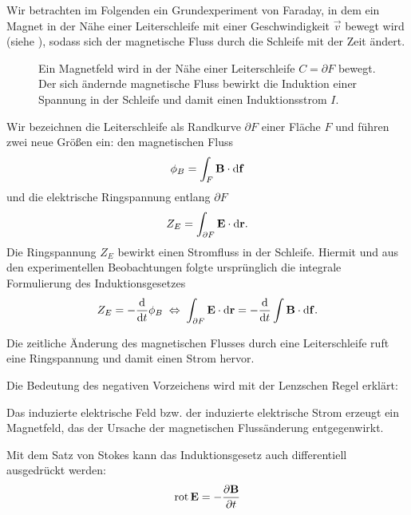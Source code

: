 Wir betrachten im Folgenden ein Grundexperiment von Faraday, in dem ein Magnet in der Nähe einer Leiterschleife mit einer Geschwindigkeit $\vec v$ bewegt wird (siehe ), sodass sich der magnetische Fluss durch die Schleife mit der Zeit ändert.

\begin{figure}
	\centering
	\tfigInductionA
	\caption{Ein Magnetfeld wird in der Nähe einer Leiterschleife $C=\partial F$ bewegt. Der sich ändernde magnetische Fluss bewirkt die Induktion einer Spannung in der Schleife und damit einen Induktionsstrom $I$. }
	\label{fig:inductionA}
\end{figure}

Wir bezeichnen die Leiterschleife als Randkurve $\partial F$ einer Fläche $F$ und führen zwei neue Größen ein: den magnetischen Fluss
\begin{equation*}
	\phi _{B}=\int _{F}\mathbf{B}\cdot \mathop{}\!\mathrm{d} \mathbf{f}
\end{equation*}
und die elektrische Ringspannung entlang $\partial F$
\begin{equation*}
	Z_{E}=\int _{\partial F}\mathbf{E}\cdot \mathop{}\!\mathrm{d} \mathbf{r}.
\end{equation*}
Die Ringspannung $Z_{E}$ bewirkt einen Stromfluss in der Schleife. Hiermit und aus den experimentellen Beobachtungen folgte ursprünglich die integrale Formulierung des Induktionsgesetzes
\begin{equation*}
	Z_{E}=-\frac{\mathop{}\!\mathrm{d} }{\mathop{}\!\mathrm{d} t}\phi _{B}\;\Leftrightarrow\; \int _{\partial F}\mathbf{E}\cdot \mathop{}\!\mathrm{d} \mathbf{r}=-\frac{\mathop{}\!\mathrm{d} }{\mathop{}\!\mathrm{d} t}\int \mathbf{B}\cdot \mathop{}\!\mathrm{d} \mathbf{f}.
\end{equation*}

\begin{formal}
	Die zeitliche Änderung des magnetischen Flusses durch eine Leiterschleife ruft eine Ringspannung und damit einen Strom hervor.
\end{formal}
Die Bedeutung des negativen Vorzeichens wird mit der Lenzschen Regel erklärt:
\begin{formal}
	Das induzierte elektrische Feld bzw. der induzierte elektrische Strom erzeugt ein Magnetfeld, das der Ursache der magnetischen Flussänderung entgegenwirkt.
\end{formal}
Mit dem Satz von Stokes kann das Induktionsgesetz auch differentiell ausgedrückt werden:
\begin{equation*}
	\operatorname{rot} \mathbf{E}=-\frac{\partial \mathbf{B}}{\partial t}
\end{equation*}

